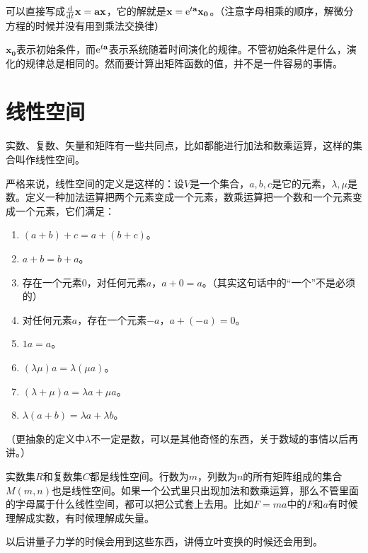 可以直接写成$\frac{\mathop{}\!\mathrm{d}}{\mathop{}\!\mathrm{d} t} \mathbf{x}=\mathbf{a} \mathbf{x}$，它的解就是$\mathbf{x}=\mathrm{e}^{t \mathbf{a}} \mathbf{x_0}$。（注意字母相乘的顺序，解微分方程的时候并没有用到乘法交换律）

$\mathbf{x_0}$表示初始条件，而$\mathrm{e}^{t \mathbf{a}}$表示系统随着时间演化的规律。不管初始条件是什么，演化的规律总是相同的。然而要计算出矩阵函数的值，并不是一件容易的事情。
\section{线性空间}
实数、复数、矢量和矩阵有一些共同点，比如都能进行加法和数乘运算，这样的集合叫作线性空间。

严格来说，线性空间的定义是这样的：设$V$是一个集合，$a, b, c$是它的元素，$\lambda, \mu$是数。定义一种加法运算把两个元素变成一个元素，数乘运算把一个数和一个元素变成一个元素，它们满足：
\begin{enumerate}
\item $(a+b)+c=a+(b+c)$。
\item $a+b=b+a$。
\item 存在一个元素$0$，对任何元素$a$，$a+0=a$。（其实这句话中的“一个”不是必须的）
\item 对任何元素$a$，存在一个元素$-a$，$a+(-a)=0$。
\item $1 a=a$。
\item $(\lambda \mu) a=\lambda (\mu a)$。
\item $(\lambda+\mu) a=\lambda a +\mu a$。
\item $\lambda (a+b)=\lambda a +\lambda b$。
\end{enumerate}

（更抽象的定义中$\lambda$不一定是数，可以是其他奇怪的东西，关于数域的事情以后再讲。）

实数集$R$和复数集$C$都是线性空间。行数为$m$，列数为$n$的所有矩阵组成的集合$M(m, n)$也是线性空间。如果一个公式里只出现加法和数乘运算，那么不管里面的字母属于什么线性空间，都可以把公式套上去用。比如$F=m a$中的$F$和$a$有时候理解成实数，有时候理解成矢量。

以后讲量子力学的时候会用到这些东西，讲傅立叶变换的时候还会用到。
